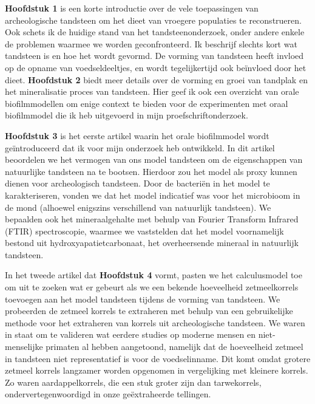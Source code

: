 \documentclass[
  b5paper,
]{book}
\begin{document}
\textbf{Hoofdstuk 1} is een korte introductie over de vele toepassingen
van archeologische tandsteen om het dieet van vroegere populaties te
reconstrueren. Ook schets ik de huidige stand van het
tandsteenonderzoek, onder andere enkele de problemen waarmee we worden
geconfronteerd. Ik beschrijf slechts kort wat tandsteen is en hoe het
wordt gevormd. De vorming van tandsteen heeft invloed op de opname van
voedseldeeltjes, en wordt tegelijkertijd ook beïnvloed door het dieet.
\textbf{Hoofdstuk 2} biedt meer details over de vorming en groei van
tandplak en het mineralisatie proces van tandsteen. Hier geef ik ook een
overzicht van orale biofilmmodellen om enige context te bieden voor de
experimenten met oraal biofilmmodel die ik heb uitgevoerd in mijn
proefschriftonderzoek.

\textbf{Hoofdstuk 3} is het eerste artikel waarin het orale biofilmmodel
wordt geïntroduceerd dat ik voor mijn onderzoek heb ontwikkeld. In dit
artikel beoordelen we het vermogen van ons model tandsteen om de
eigenschappen van natuurlijke tandsteen na te bootsen. Hierdoor zou het
model als proxy kunnen dienen voor archeologisch tandsteen. Door de
bacteriën in het model te karakteriseren, vonden we dat het model
indicatief was voor het microbioom in de mond (alhoewel enigszins
verschillend van natuurlijk tandsteen). We bepaalden ook het
mineraalgehalte met behulp van Fourier Transform Infrared (FTIR)
spectroscopie, waarmee we vaststelden dat het model voornamelijk bestond
uit hydroxyapatietcarbonaat, het overheersende mineraal in natuurlijk
tandsteen.

In het tweede artikel dat \textbf{Hoofdstuk 4} vormt, pasten we het
calculusmodel toe om uit te zoeken wat er gebeurt als we een bekende
hoeveelheid zetmeelkorrels toevoegen aan het model tandsteen tijdens de
vorming van tandsteen. We probeerden de zetmeel korrels te extraheren
met behulp van een gebruikelijke methode voor het extraheren van korrels
uit archeologische tandsteen. We waren in staat om te valideren wat
eerdere studies op moderne mensen en niet-menselijke primaten al hebben
aangetoond, namelijk dat de hoeveelheid zetmeel in tandsteen niet
representatief is voor de voedselinname. Dit komt omdat grotere zetmeel
korrels langzamer worden opgenomen in vergelijking met kleinere korrels.
Zo waren aardappelkorrels, die een stuk groter zijn dan tarwekorrels,
ondervertegenwoordigd in onze geëxtraheerde tellingen.
\end{document}
